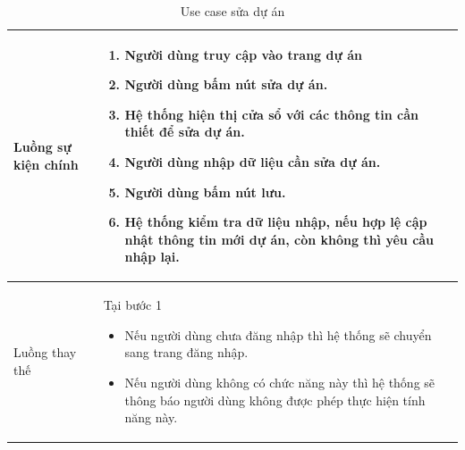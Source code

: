 \documentclass[12pt,a4paper]{article}
\begin{document}
\begin{table}[H]
\begin{tabular}{|p{3.5cm}|p{11.5cm}|c|}
            Luồng sự kiện chính & \vspace{-.8cm}\begin{enumerate}
                                                    \item Người dùng truy cập vào trang dự án
                                                    \item  Người dùng bấm nút sửa dự án.
                                                    \item  Hệ thống hiện thị cửa sổ với các thông tin cần thiết để sửa dự án.
                                                    \item  Người dùng nhập dữ liệu cần sửa dự án.
                                                    \item Người dùng bấm nút lưu.
                                                    \item Hệ thống kiểm tra dữ liệu nhập, nếu hợp lệ cập nhật thông tin mới dự án, còn không thì yêu cầu nhập lại.
            \end{enumerate}
            \\
            \hline
            Luồng thay thế & Tại bước 1\newline
            \vspace{-.8cm}\begin{itemize}
                              \item Nếu người dùng chưa đăng nhập thì hệ thống sẽ chuyển sang trang đăng nhập.
                              \item  Nếu người dùng không có chức năng này thì hệ thống sẽ thông báo người dùng không được phép thực hiện tính năng này.
            \end{itemize}
            \\
            \hline
        \end{tabular}
        \caption{Use case sửa dự án }
    \end{table}


\end{document}

